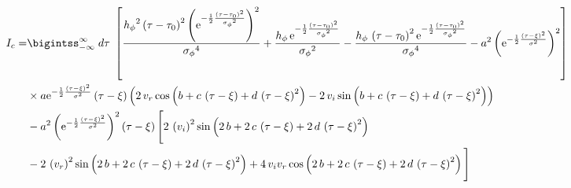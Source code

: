 \begin{align}
I_c  =& \bigintss_{-\infty}^{\infty} \; d\tau\; \left[ \frac{{{ h_{\phi}}}^{2} \left( \tau-{ \tau_0} \right) ^{2} \left( {
{\rm e}^{-\frac{1}{2}{\frac { \left( \tau-{ \tau_0} \right) ^{2}}{{{ 
\sigma_{\phi}}}^{2}}}}} \right) ^{2}}{{{ \sigma_{\phi}}}^{4}}+\frac{{ h_{\phi}}
\,{{\rm e}^{-\frac{1}{2}{\frac { \left( \tau-{ \tau_0} \right) ^{2}}{{{ 
\sigma_{\phi}}}^{2}}}}}}{{{ \sigma_{\phi}}}^{2}}-\frac{{ h_{\phi}}\, \left( \tau-{
 \tau_0} \right) ^{2}{{\rm e}^{-\frac{1}{2}{\frac { \left( \tau-{ \tau_0}
 \right) ^{2}}{{{ \sigma_{\phi}}}^{2}}}}}}{{{ \sigma_{\phi}}}^{4}}-{a}^{
2} \left( {{\rm e}^{-\frac{1}{2}{\frac { \left( \tau-\xi \right) ^{2}}{{
\sigma}^{2}}}}} \right) ^{2} \right] \nonumber \\
&\times a{{\rm e}^{-\frac{1}{2}{\frac { \left( 
\tau-\xi \right) ^{2}}{{\sigma}^{2}}}}} \left( \tau-\xi \right) 
 \left( 2\,v_r\cos \left( b+c\,
 \left( \tau-\xi \right) +d\, \left( \tau-\xi \right) ^{2}
 \right) -2\,v_i \sin \left( b+c\,
 \left( \tau-\xi \right) +d\, \left( \tau-\xi \right) ^{2}
 \right)  \right) \nonumber \\
 &-{a}^{2} \left( {{\rm e}^{-\frac{1}{2}{\frac { \left( \tau-{
 \xi} \right) ^{2}}{{\sigma}^{2}}}}} \right) ^{2} \left( \tau-\xi
 \right)  \Bigg[ 2\, \left( v_i 
 \right) ^{2}\sin \left( 2\,b+2\,c\, \left( \tau-\xi \right) +2\,d\,
 \left( \tau-\xi \right) ^{2} \right) \nonumber \\
 &-2\, \left( v_r  \right) ^{2}\sin \left( 2\,b+2\,c\, \left( \tau-{ \xi
} \right) +2\,d\, \left( \tau-\xi \right) ^{2} \right) +4\,v_i v_r \cos
 \left( 2\,b+2\,c\, \left( \tau-\xi \right) +2\,d\, \left( \tau-{ \xi
} \right) ^{2} \right)  \Bigg] 
\end{align}

